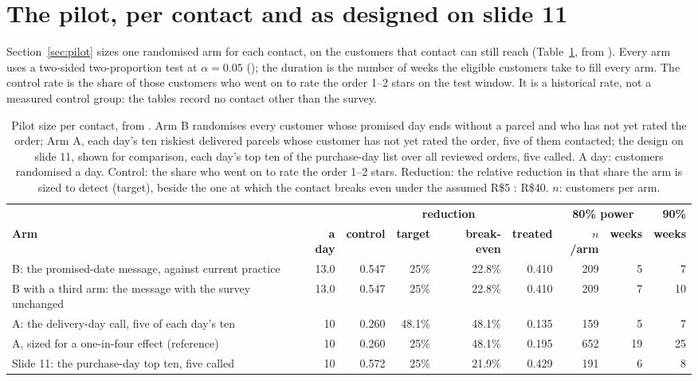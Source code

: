 \section{The pilot, per contact and as designed on slide 11}
\label{app:pilot}

Section~\ref{sec:pilot} sizes one randomised arm for each contact, on the
customers that contact can still reach (Table~\ref{tab:pilot-arms}, from
). Every arm uses a two-sided
two-proportion test at $\alpha = 0.05$ (); the
duration is the number of weeks the eligible customers take to fill every arm.
The control rate is the share of those customers who went on to rate the order
1--2 stars on the test window. It is a historical rate, not a measured control
group: the tables record no contact other than the survey.

\begin{table}[htbp]
\centering
\caption{Pilot size per contact, from . Arm B
randomises every customer whose promised day ends without a parcel and who has
not yet rated the order; Arm A, each day's ten riskiest delivered parcels whose
customer has not yet rated the order, five of them contacted; the design on
slide 11, shown for comparison, each day's top ten of the purchase-day list over
all reviewed orders, five called. A day: customers randomised a day. Control:
the share who went on to rate the order 1--2 stars. Reduction: the relative
reduction in that share the arm is sized to detect (target), beside the one at
which the contact breaks even under the assumed R\$5 : R\$40. $n$: customers per
arm.}
\label{tab:pilot-arms}
\footnotesize
\setlength{\tabcolsep}{3.5pt}
\begin{tabular}{@{}p{4.3cm}rrrrrrrr@{}}
\toprule
 & & & \multicolumn{2}{c}{\textbf{reduction}} & &
\multicolumn{2}{c}{\textbf{80\% power}} & \textbf{90\%} \\
\cmidrule(lr){4-5}\cmidrule(lr){7-8}\cmidrule(l){9-9}
\textbf{Arm} & \textbf{a day} & \textbf{control} & \textbf{target} &
\textbf{break-even} & \textbf{treated} & \textbf{$n$/arm} & \textbf{weeks} &
\textbf{weeks} \\
\midrule
\raggedright B: the promised-date message, against current practice & 13.0 &
0.547 & 25\% & 22.8\% & 0.410 & 209 & 5 & 7 \tabularnewline[2pt]
\raggedright B with a third arm: the message with the survey unchanged & 13.0 &
0.547 & 25\% & 22.8\% & 0.410 & 209 & 7 & 10 \tabularnewline[2pt]
\raggedright A: the delivery-day call, five of each day's ten & 10 & 0.260 &
48.1\% & 48.1\% & 0.135 & 159 & 5 & 7 \tabularnewline[2pt]
\raggedright A, sized for a one-in-four effect (reference) & 10 & 0.260 & 25\% &
48.1\% & 0.195 & 652 & 19 & 25 \tabularnewline
\midrule
\raggedright Slide 11: the purchase-day top ten, five called & 10 & 0.572 & 25\%
& 21.9\% & 0.429 & 191 & 6 & 8 \tabularnewline
\bottomrule
\end{tabular}
\end{table}

